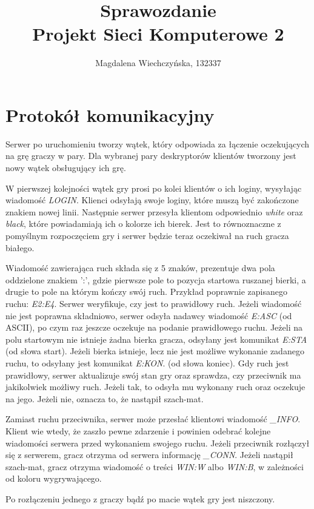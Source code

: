 \documentclass[a4paper]{article}
\title{Sprawozdanie\\Projekt Sieci Komputerowe 2}
\author{Magdalena Wiechczyńska, 132337}
\date{} %
\begin{document}
\maketitle

\section{Protokół komunikacyjny}
	Serwer po uruchomieniu tworzy wątek, który odpowiada za łączenie oczekujących na grę graczy w pary. Dla wybranej pary deskryptorów klientów tworzony jest nowy wątek obsługujący ich grę.
	
	W pierwszej kolejności wątek gry prosi po kolei klientów o ich loginy, wysyłając wiadomość \textit{LOGIN}.
Klienci odsyłają swoje loginy, które muszą być zakończone znakiem nowej linii. Następnie serwer przesyła klientom odpowiednio \textit{white} oraz \textit{black}, które powiadamiają ich o kolorze ich bierek. Jest to równoznaczne z pomyślnym rozpoczęciem gry i serwer będzie teraz oczekiwał na ruch gracza białego.

	Wiadomość zawierająca ruch składa się z 5 znaków, prezentuje dwa pola oddzielone znakiem ':', gdzie pierwsze pole to pozycja startowa ruszanej bierki, a drugie to pole na którym kończy swój ruch.
Przykład poprawnie zapisanego ruchu: \textit{E2:E4}. Serwer weryfikuje, czy jest to prawidłowy ruch. Jeżeli wiadomość nie jest poprawna składniowo, serwer odsyła nadawcy wiadomość \textit{E:ASC} (od ASCII), po czym raz jeszcze oczekuje na podanie prawidłowego ruchu. Jeżeli na polu startowym nie istnieje żadna bierka gracza, odsyłany jest komunikat \textit{E:STA} (od słowa start). Jeżeli bierka istnieje, lecz nie jest możliwe wykonanie zadanego ruchu, to odsyłany jest komunikat \textit{E:KON}. (od słowa koniec). Gdy ruch jest prawidłowy, serwer aktualizuje swój stan gry oraz sprawdza, czy przeciwnik ma jakikolwiek możliwy ruch. Jeżeli tak, to odsyła mu wykonany ruch oraz oczekuje na jego.
Jeżeli nie, oznacza to, że nastąpił szach-mat.
	
	Zamiast ruchu przeciwnika, serwer może przesłać klientowi wiadomość \textit{\_INFO}. Klient wie wtedy, że zaszło pewne zdarzenie i powinien odebrać kolejne wiadomości serwera przed wykonaniem swojego ruchu. Jeżeli przeciwnik rozłączył się z serwerem, gracz otrzyma od serwera informację \textit{\_CONN}. Jeżeli nastąpił szach-mat, gracz otrzyma wiadomość o treści \textit{WIN:W} albo \textit{WIN:B}, w zależności od koloru wygrywającego.

	Po rozłączeniu jednego z graczy bądź po macie wątek gry jest niszczony.
	
\end{document}
